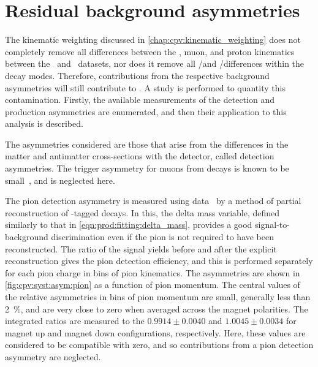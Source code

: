 \begin{table}
  \centering
  \caption{%
    Differences between asymmetries measured with the nominal fit method and 
    the sideband subtraction, measured for each data sub-sample and combination 
    of sub-samples.
    The uncertainties quoted assume the values found by the two methods are 
    fully correlated.
    The computation of the combinations, ``2011 + 2012'' and ``Average'', is 
    defined in \cref{chap:cpv:results:combination}.
  }
  \label{tab:cpv:syst:sbs_differences}
  
\end{table}

\section{Residual background asymmetries}
\label{chap:cpv:syst:asym}

The kinematic weighting discussed in \cref{chap:cpv:kinematic_weighting} does 
not completely remove all differences between the \PLambdab, muon, and proton 
kinematics between the \pKK\ and \ppipi\ datasets, nor does it remove all 
\PKminus/\PKplus and \Ppiminus/\Ppiplus differences within the decay modes.
Therefore, contributions from the respective background asymmetries will still 
contribute to \dACP\@.
A study is performed to quantity this contamination.
Firstly, the available measurements of the detection and production asymmetries 
are enumerated, and then their application to this analysis is described.

The asymmetries considered are those that arise from the differences in the 
matter and antimatter cross-sections with the detector, called detection 
asymmetries.
The trigger asymmetry for muons from \Pbottom decays is known to be 
small~\cite{Aaij:2016yze}, and is neglected here.

The pion detection asymmetry is measured using  
data~\cite{Aaij:2012cy} by a method of partial reconstruction of 
\PDstarp-tagged \decay{\PDzero}{\PKminus\Ppiplus\Ppiminus\Ppiplus} decays.
In this, the delta mass variable, defined similarly to that in 
\cref{eqn:prod:fitting:delta_mass}, provides a good signal-to-background 
discrimination even if the pion is not required to have been reconstructed.
The ratio of the signal yields before and after the explicit reconstruction 
gives the pion detection efficiency, and this is performed separately for each 
pion charge in bins of pion kinematics.
The asymmetries are shown in \cref{fig:cpv:syst:asym:pion} as a function of 
pion momentum.
The central values of the relative asymmetries in bins of pion momentum are 
small, generally less than \SI{2}{\percent}, and are very close to zero when 
averaged across the magnet polarities.
The integrated ratios are measured to the $0.9914 \pm 0.0040$ and $1.0045 \pm 
0.0034$ for magnet up and magnet down configurations, respectively.
Here, these values are considered to be compatible with zero, and so 
contributions from a pion detection asymmetry are neglected.

